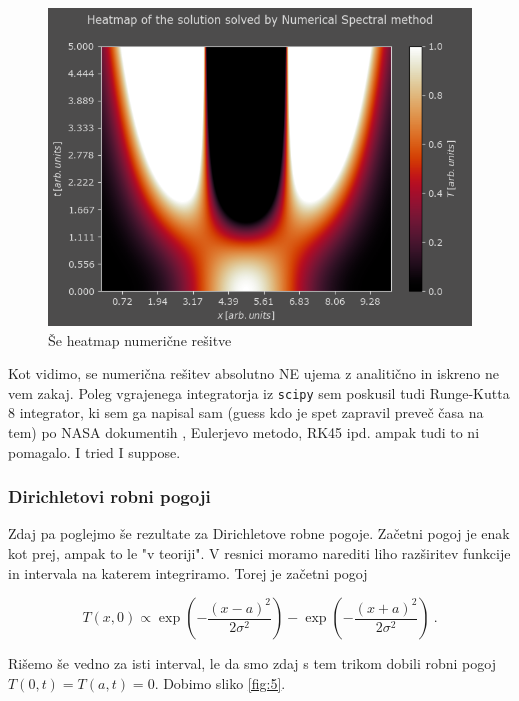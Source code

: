 \documentclass[a4paper]{article}
\begin{document}
\begin{figure}[H]
    \centering
        \includegraphics[width=\linewidth]{./images/S_Numeric_P_Heatmap.png}
        \caption{Še heatmap numerične rešitve}
    \label{fig:4}
\end{figure}

Kot vidimo, se numerična rešitev absolutno NE ujema z analitično in iskreno ne vem zakaj. Poleg vgrajenega
integratorja iz \texttt{scipy} sem poskusil tudi Runge-Kutta 8 integrator, ki sem ga napisal sam (guess kdo je
spet zapravil preveč časa na tem) po NASA dokumentih \cite{Fehlberg_1968}, Eulerjevo metodo, RK45 ipd. 
ampak tudi to ni pomagalo. I tried I suppose.

\subsubsection{Dirichletovi robni pogoji}
Zdaj pa poglejmo še rezultate za Dirichletove robne pogoje. Začetni pogoj je enak kot prej, ampak to le "v teoriji".
V resnici moramo narediti liho razširitev funkcije in intervala na katerem integriramo. Torej je začetni pogoj

\begin{equation}
    T(x, 0) \propto \exp{\left(-\frac{(x-a)^2}{2\sigma^2}\right)} - \exp{\left(-\frac{(x+a)^2}{2\sigma^2}\right)}\>.
\end{equation}

Rišemo še vedno za isti interval, le da smo zdaj s tem trikom dobili robni pogoj $T(0, t) = T(a, t) = 0$. Dobimo sliko
\ref{fig:5}.
\end{document}
